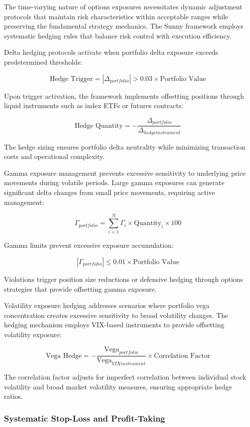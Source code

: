 \documentclass[
  american,
  11pt,
  11pt,
  letterpaper,
  onecolumn]{article}
\begin{document}
The time-varying nature of options exposures necessitates dynamic
adjustment protocols that maintain risk characteristics within
acceptable ranges while preserving the fundamental strategy mechanics.
The Sunny framework employs systematic hedging rules that balance risk
control with execution efficiency.

Delta hedging protocols activate when portfolio delta exposure exceeds
predetermined thresholds:

\[\text{Hedge Trigger} = |\Delta_{portfolio}| > 0.03 \times \text{Portfolio Value}\]

Upon trigger activation, the framework implements offsetting positions
through liquid instruments such as index ETFs or futures contracts:

\[\text{Hedge Quantity} = -\frac{\Delta_{portfolio}}{\Delta_{hedge instrument}}\]

The hedge sizing ensures portfolio delta neutrality while minimizing
transaction costs and operational complexity.

Gamma exposure management prevents excessive sensitivity to underlying
price movements during volatile periods. Large gamma exposures can
generate significant delta changes from small price movements, requiring
active management:

\[\Gamma_{portfolio} = \sum_{i=1}^{N} \Gamma_i \times \text{Quantity}_i \times 100\]

Gamma limits prevent excessive exposure accumulation:

\[|\Gamma_{portfolio}| \leq 0.01 \times \text{Portfolio Value}\]

Violations trigger position size reductions or defensive hedging through
options strategies that provide offsetting gamma exposure.

Volatility exposure hedging addresses scenarios where portfolio vega
concentration creates excessive sensitivity to broad volatility changes.
The hedging mechanism employs VIX-based instruments to provide
offsetting volatility exposure:

\[\text{Vega Hedge} = -\frac{\text{Vega}_{portfolio}}{\text{Vega}_{VIX instrument}} \times \text{Correlation Factor}\]

The correlation factor adjusts for imperfect correlation between
individual stock volatility and broad market volatility measures,
ensuring appropriate hedge ratios.

\subsubsection{Systematic Stop-Loss and
Profit-Taking}\label{systematic-stop-loss-and-profit-taking}
\end{document}
